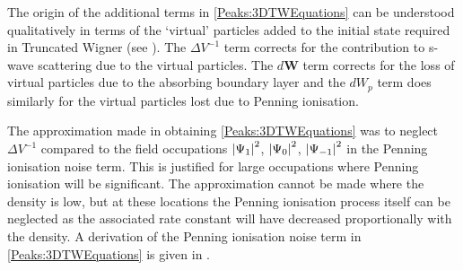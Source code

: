 The origin of the additional terms in \eqref{Peaks:3DTWEquations} can be understood qualitatively in terms of the `virtual' particles added to the initial state required in Truncated Wigner (see ). The $\Delta V^{-1}$ term corrects for the contribution to s-wave scattering due to the virtual particles. The $d \bm{W}$ term corrects for the loss of virtual particles due to the absorbing boundary layer and the $dW_p$ term does similarly for the virtual particles lost due to Penning ionisation.

The approximation made in obtaining \eqref{Peaks:3DTWEquations} was to neglect $\Delta V^{-1}$ compared to the field occupations $\left|\Psi_1\right|^2$, $\left|\Psi_0\right|^2$, $\left|\Psi_{-1}\right|^2$ in the Penning ionisation noise term. This is justified for large occupations where Penning ionisation will be significant. The approximation cannot be made where the density is low, but at these locations the Penning ionisation process itself can be neglected as the associated rate constant will have decreased proportionally with the density. A derivation of the Penning ionisation noise term in \eqref{Peaks:3DTWEquations} is given in .

\parasep

